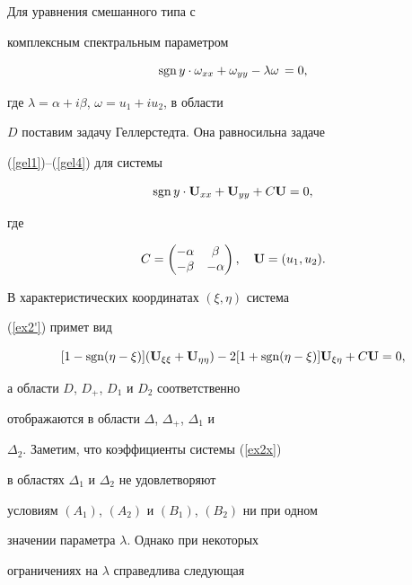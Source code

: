 \begin{exam}


Для уравнения смешанного типа с


комплексным спектральным параметром


\begin{equation}\label{ex2}


\sgn y\cdot\omega_{xx} + \omega_{yy}


-\lambda\omega\,=0,


\end{equation}


где $\lambda=\alpha+i\beta$, $\omega= u_1+iu_2$, в области


$D$ поставим задачу Геллерстедта. Она равносильна задаче


(\ref{gel1})--(\ref{gel4}) для системы


\begin{equation}\label{ex2'}


\sgn y\cdot {\bold U}_{xx} + {\bold U}_{yy} +C{\bold U}=0,


\end{equation}


где


$$




C=\begin{pmatrix}


-\alpha & \beta \\ -\beta & -\alpha


\end{pmatrix}


,\quad {\bold U}=(u_1,u_2).




$$


В характеристических координатах $(\xi,\eta)$ система


(\ref{ex2'}) примет вид


\begin{equation}\label{ex2x}


[1-\sgn (\eta-\xi)]({\bold U}_{\xi\xi}+{\bold


U}_{\eta\eta})-2[1+\sgn (\eta-\xi)]{\bold


U}_{\xi\eta}+C{\bold U}=0,


\end{equation}


а области $D$, $D_+$, $D_1$ и $D_2$ соответственно


отображаются в области $\Delta$, $\Delta_+$, $\Delta_1$ и


$\Delta_2$. Заметим, что коэффициенты системы (\ref{ex2x})


в областях $\Delta_1$ и $\Delta_2$ не удовлетворяют


условиям $(A_1)$, $(A_2)$ и $(B_1)$, $(B_2)$ ни при одном


значении параметра $\lambda$. Однако при некоторых


ограничениях на $\lambda$ справедлива следующая


\end{exam}





